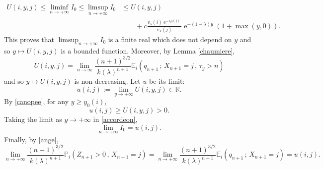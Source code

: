 \documentclass[12pt]{amsart}
\theoremstyle{definition}
\numberwithin{equation}{section}
\def\bb#1{\mathbb{#1}}
\def\geq{\geqslant}
\def\leq{\leqslant}
\renewcommand\ll{\lambda}
\DeclareMathOperator{\e}{e}
\begin{document}
\begin{align}
	U(i,y,j) \leq \liminf_{n\to +\infty} I_0 \leq \limsup_{n\to +\infty} I_0 &\leq U(i,y,j) \nonumber\\
	&\qquad + c\frac{v_{\ll}(i)\e^{-\ll \rho(j)}}{v_{\ll}(j)} \e^{-(1-\ll)y} (1+\max(y,0)).
	\label{accordeon}
\end{align}
This proves that $\limsup_{n\to +\infty} I_0$ is a finite real which does not depend on $y$ and so $y \mapsto U(i,y,j)$ is a bounded function. Moreover, by Lemma \ref{chaumiere}, 
\[
U(i,y,j) = \lim_{n\to\infty} \frac{(n+1)^{3/2}}{k(\ll)^{n+1}} \bb E_i \left( q_{n+1} \,;\, X_{n+1} = j \,,\, \tau_y > n \right)
\]
and so $y \mapsto U(i,y,j)$ is non-decreasing. Let $u$ be its limit:
\[
u(i,j) := \lim_{y\to+\infty} U(i,y,j) \in \bb R.
\]
By \eqref{canopee}, for any $y \geq y_0(i)$,
\[
u(i,j) \geq U(i,y,j) > 0.
\]
Taking the limit as $y \to +\infty$ in \eqref{accordeon},
\[
\lim_{n \to +\infty} I_0 = u(i,j).
\]
Finally, by \eqref{ange},
\[
\lim_{n \to +\infty} \frac{(n+1)^{3/2}}{k(\ll)^{n+1}} \bb P_i \left( Z_{n+1} > 0 \,,\, X_{n+1} = j \right) = \lim_{n \to +\infty} \frac{(n+1)^{3/2}}{k(\ll)^{n+1}} \bb E_i \left( q_{n+1} \,;\, X_{n+1} = j \right) = u(i,j).
\]




\vskip5mm
\end{document}
